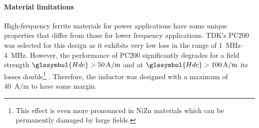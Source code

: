 \documentclass{IPEC2026}
\newcommand{\sbl}[1]{\glssymbol{#1}}
\begin{document}
\paragraph{Material limitations}
High-frequency ferrite materials for power applications have some unique properties that differ from those for lower frequency applications. TDK's PC200 was selected for this design as it exhibits very low loss in the range of \qtyrange{1}{4}{\MHz}. However, the performance of PC200 significantly degrades for a field strength $\sbl{Hdc} > \qty{50}{A/m}$ and at $\sbl{Hdc} > \qty{100}{A/m}$ its losses double\footnote{This effect is even more pronounced in NiZn materials which can be permanently damaged by large fields.} \cite{tdkHighFrequencyLowLossFerrite}. Therefore, the inductor was designed with a maximum \sbl{Hdc} of \qty{40}{A/m} to have some margin.
\end{document}
